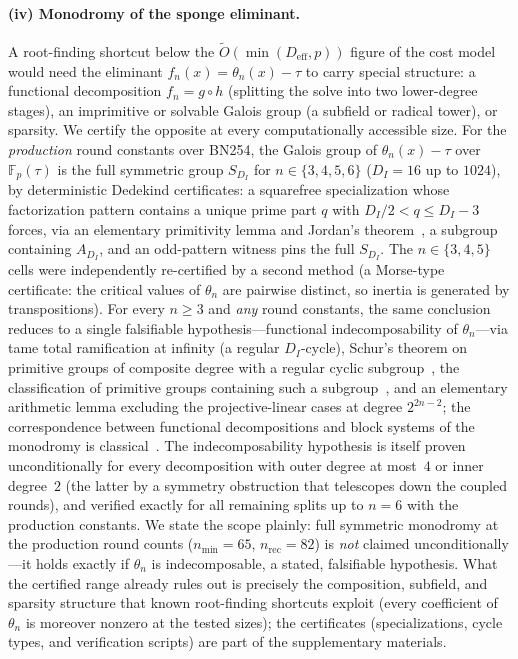 \documentclass[11pt,a4paper]{article}
\theoremstyle{definition}
\newcommand{\Fp}{\mathbb{F}_p}
\begin{document}
\paragraph{(iv) Monodromy of the sponge eliminant.}
A root-finding shortcut below the
$\widetilde{O}(\min(D_{\mathrm{eff}},p))$ figure of the cost model
would need the eliminant $f_n(x) = \theta_n(x) - \tau$ to carry
special structure: a functional decomposition $f_n = g \circ h$
(splitting the solve into two lower-degree stages), an imprimitive or
solvable Galois group (a subfield or radical tower), or sparsity. We
certify the opposite at every computationally accessible size. For
the \emph{production} round constants over BN254, the Galois group of
$\theta_n(x) - \tau$ over $\Fp(\tau)$ is the full symmetric group
$S_{D_I}$ for $n \in \{3,4,5,6\}$ ($D_I = 16$ up to $1024$), by
deterministic Dedekind certificates: a squarefree specialization
whose factorization pattern contains a unique prime part $q$ with
$D_I/2 < q \le D_I - 3$ forces, via an elementary primitivity lemma
and Jordan's theorem~\cite{Wielandt1964}, a subgroup containing
$A_{D_I}$, and an odd-pattern witness pins the full $S_{D_I}$. The
$n \in \{3,4,5\}$ cells were independently re-certified by a second
method (a Morse-type certificate: the critical values of $\theta_n$
are pairwise distinct, so inertia is generated by transpositions).
For every $n \ge 3$ and \emph{any} round constants, the same
conclusion reduces to a single falsifiable hypothesis---functional
indecomposability of $\theta_n$---via tame total ramification at
infinity (a regular $D_I$-cycle), Schur's theorem on primitive
groups of composite degree with a regular cyclic
subgroup~\cite{Schur1933,Wielandt1964}, the classification of
primitive groups containing such a subgroup~\cite{Jones2002}, and an
elementary arithmetic lemma excluding the projective-linear cases at
degree $2^{2n-2}$; the correspondence between functional
decompositions and block systems of the monodromy is
classical~\cite{FriedMacRae1969}. The indecomposability hypothesis
is itself proven unconditionally for every decomposition with outer
degree at most~$4$ or inner degree~$2$ (the latter by a symmetry
obstruction that telescopes down the coupled rounds), and verified
exactly for all remaining splits up to $n = 6$ with the production
constants. We state the scope plainly: full symmetric monodromy at
the production round counts ($n_{\min} = 65$, $n_{\mathrm{rec}} =
82$) is \emph{not} claimed unconditionally---it
holds exactly if $\theta_n$ is indecomposable, a stated, falsifiable
hypothesis. What the certified range already rules out is precisely
the composition, subfield, and sparsity structure that known
root-finding shortcuts exploit (every coefficient of $\theta_n$ is
moreover nonzero at the tested sizes); the certificates
(specializations, cycle types, and verification scripts) are part of
the supplementary materials.
\end{document}
